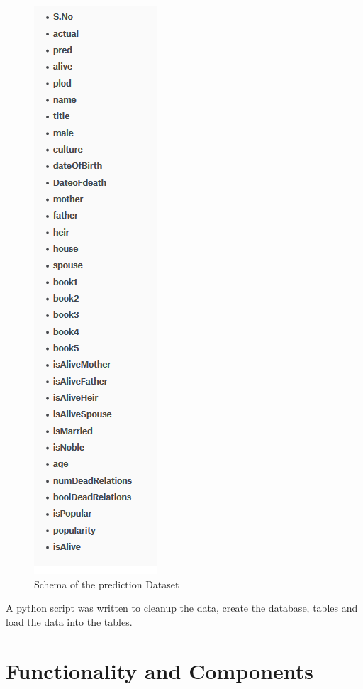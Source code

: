 \documentclass[]{article}
\begin{document}
\begin{itemize}
\begin{figure}
\centering
        \includegraphics[totalheight=13cm]{prediction.png}
		\caption{Schema of the prediction Dataset}
\end{figure}


\end{itemize}

\vspace{25px}

A python script was written to cleanup the data, create the database, tables and load the data into the tables. 
\section{Functionality and Components}
\end{document}

